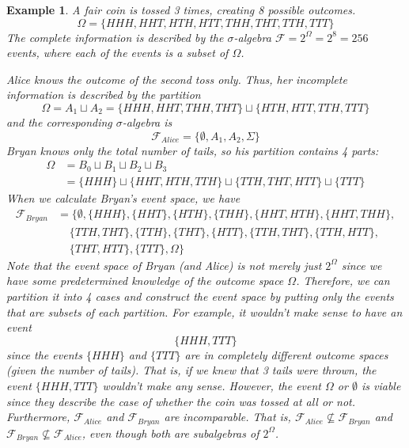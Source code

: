 \documentclass{article}
\newtheorem{example}{Example}[section]
\theoremstyle{remark}
\theoremstyle{definition}
\begin{document}
\begin{example}
A fair coin is tossed 3 times, creating 8 possible outcomes. 
\[\Omega = \{HHH, HHT, HTH, HTT, THH, THT, TTH, TTT\}\]
The complete information is described by the $\sigma$-algebra $\mathcal{F} = 2^{\Omega} = 2^8 = 256$ events, where each of the events is a subset of $\Omega$. 

Alice knows the outcome of the second toss only. Thus, her incomplete information is described by the partition 
\[\Omega = A_1 \sqcup A_2 = \{HHH, HHT, THH, THT\} \sqcup \{HTH, HTT, TTH, TTT\}\]
and the corresponding $\sigma$-algebra is 
\[\mathcal{F}_{Alice} = \{\emptyset, A_1, A_2, \Sigma\}\]
Bryan knows only the total number of tails, so his partition contains 4 parts: 
\begin{align*}
    \Omega & = B_0 \sqcup B_1 \sqcup B_2 \sqcup B_3 \\
    & = \{HHH\} \sqcup \{HHT, HTH, TTH\} \sqcup \{TTH, THT, HTT\} \sqcup \{TTT\}
\end{align*}
When we calculate Bryan's event space, we have
\begin{align*}
    \mathcal{F}_{Bryan} & = \big\{\emptyset, \{HHH\}, \{HHT\}, \{HTH\}, \{THH\}, \{HHT, HTH\}, \{HHT, THH\}, \\
    & \;\;\;\;\{TTH, THT\}, \{TTH\}, \{THT\}, \{HTT\}, \{TTH, THT\},\{TTH, HTT\}, \\
    & \;\;\;\;\{THT, HTT\}, \{TTT\}, \Omega \big\} 
\end{align*}
Note that the event space of Bryan (and Alice) is not merely just $2^{\Omega}$ since we have some predetermined knowledge of the outcome space $\Omega$. Therefore, we can partition it into 4 cases and construct the event space by putting only the events that are subsets of each partition. For example, it wouldn't make sense to have an event 
\[\{HHH, TTT\}\]
since the events $\{HHH\}$ and $\{TTT\}$ are in completely different outcome spaces (given the number of tails). That is, if we knew that 3 tails were thrown, the event $\{HHH, TTT\}$ wouldn't make any sense. However, the event $\Omega$ or $\emptyset$ is viable since they describe the case of whether the coin was tossed at all or not. 
Furthermore, $\mathcal{F}_{Alice}$ and $\mathcal{F}_{Bryan}$ are incomparable. That is, $\mathcal{F}_{Alice} \not\subseteq \mathcal{F}_{Bryan}$ and $\mathcal{F}_{Bryan} \not\subseteq \mathcal{F}_{Alice}$, even though both are subalgebras of $2^{\Omega}$. 
\end{example}
\end{document}
